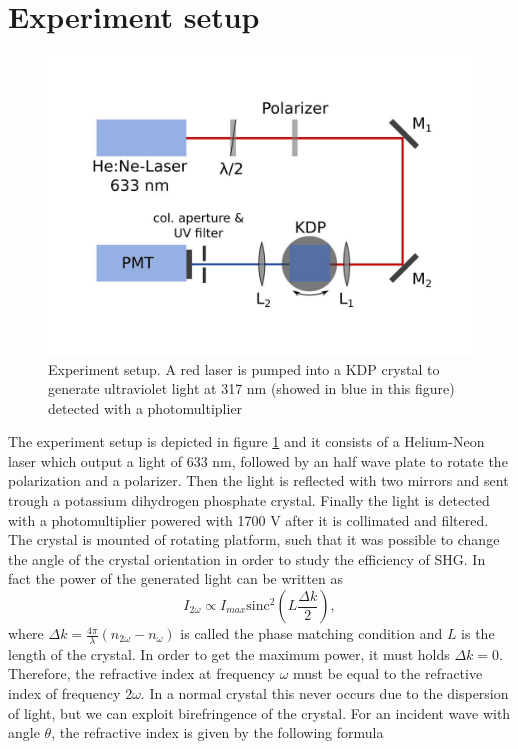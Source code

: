 \documentclass[a4paper,10pt]{article}
\begin{document}
\section{Experiment setup}
\begin{figure}[H]
\centering
\includegraphics[width=.5\textwidth]{setup}
\caption{Experiment setup. A red laser is pumped into a KDP crystal to generate ultraviolet light at 317 nm (showed in blue in this figure) detected with a photomultiplier}\label{setup}
\end{figure}
The experiment setup is depicted in figure \ref{setup} and it consists of a Helium-Neon laser which output a light of 633 nm, followed by an half wave plate to rotate the polarization and a polarizer. Then the light is reflected with two mirrors and sent trough a potassium dihydrogen phosphate crystal. Finally the light is detected with a photomultiplier powered with 1700 V after it is collimated and filtered. \\
The crystal is mounted of rotating platform, such that it was possible to change the angle of the crystal orientation in order to study the efficiency of SHG. In fact the power of the generated light can be written as
\[I_{2\omega} \propto I_{max}\text{sinc}^2\left(L\frac{\Delta k}{2 }\right),\]
where $\Delta k = \frac{4\pi}{\lambda}(n_{2\omega} - n_\omega)$ is called the phase matching condition and $L$ is the length of the crystal. In order to get the maximum power, it must holds $\Delta k = 0$. Therefore, the refractive index at frequency $\omega$ must be equal to the refractive index of frequency $2\omega$. In a normal crystal this never occurs due to the dispersion of light, but we can exploit birefringence of the crystal. For an incident wave with angle $\theta$, the refractive index is given by the following formula \cite{saleh}
\end{document}
